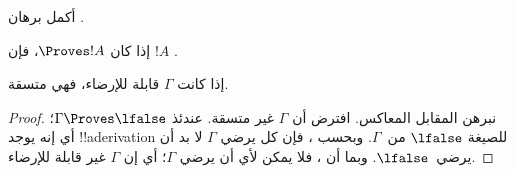 \documentclass[../../../include/open-logic-section]{subfiles}
\begin{document}
\begin{prob}
  أكمل برهان .
\end{prob}
\tagendprob

\begin{cor}
إذا كان $\Proves !A$، فإن $!A$ .
\end{cor}

\begin{cor}
إذا كانت $\Gamma$ قابلة للإرضاء، فهي متسقة.
\end{cor}

\begin{proof}
نبرهن المقابل المعاكس. افترض أن $\Gamma$ غير متسقة. عندئذ
$\Gamma \Proves \lfalse$؛ أي إنه يوجد !!a{derivation} للصيغة
$\lfalse$ من~$\Gamma$. وبحسب ، فإن كل
يرضي $\Gamma$ لا بد أن يرضي~$\lfalse$. وبما أن
، فلا يمكن لأي
 أن يرضي $\Gamma$؛ أي إن
$\Gamma$ غير قابلة للإرضاء.
\end{proof}
\end{document}
